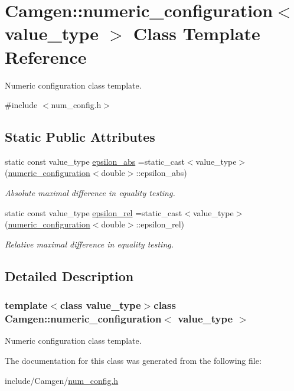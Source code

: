 \hypertarget{a00386}{}\section{Camgen\+:\+:numeric\+\_\+configuration$<$ value\+\_\+type $>$ Class Template Reference}
\label{a00386}


Numeric configuration class template.  




{\ttfamily \#include $<$num\+\_\+config.\+h$>$}

\subsection*{Static Public Attributes}
\begin{DoxyCompactItemize}
\item 
\hypertarget{a00386_a361b4d770ea73940abcedb6343e32e32}{}static const value\+\_\+type \hyperlink{a00386_a361b4d770ea73940abcedb6343e32e32}{epsilon\+\_\+abs} =static\+\_\+cast$<$value\+\_\+type$>$(\hyperlink{a00386}{numeric\+\_\+configuration}$<$double$>$\+::epsilon\+\_\+abs)\label{a00386_a361b4d770ea73940abcedb6343e32e32}

\begin{DoxyCompactList}\small\item\em Absolute maximal difference in equality testing. \end{DoxyCompactList}\item 
\hypertarget{a00386_a4fbb087868e215934a73ae0285ee40e5}{}static const value\+\_\+type \hyperlink{a00386_a4fbb087868e215934a73ae0285ee40e5}{epsilon\+\_\+rel} =static\+\_\+cast$<$value\+\_\+type$>$(\hyperlink{a00386}{numeric\+\_\+configuration}$<$double$>$\+::epsilon\+\_\+rel)\label{a00386_a4fbb087868e215934a73ae0285ee40e5}

\begin{DoxyCompactList}\small\item\em Relative maximal difference in equality testing. \end{DoxyCompactList}\end{DoxyCompactItemize}


\subsection{Detailed Description}
\subsubsection*{template$<$class value\+\_\+type$>$class Camgen\+::numeric\+\_\+configuration$<$ value\+\_\+type $>$}

Numeric configuration class template. 

The documentation for this class was generated from the following file\+:\begin{DoxyCompactItemize}
\item 
include/\+Camgen/\hyperlink{a00702}{num\+\_\+config.\+h}\end{DoxyCompactItemize}
